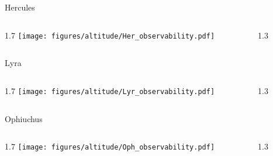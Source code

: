 \documentclass[final]{beamer}
\newlength{\colwidth}
\begin{document}
\begin{frame}[t]{}
  \Large{Hercules}
  \begin{columns}[T]
    \begin{column}{1.7\colwidth}
      \centering
      \texttt{[image: figures/altitude/Her\_observability.pdf]}
    \end{column}
    \begin{column}{1.3\colwidth}
      \Large
      
    \end{column}
  \end{columns}

  \Large{Lyra}
  \begin{columns}[T]
    \begin{column}{1.7\colwidth}
      \centering
      \texttt{[image: figures/altitude/Lyr\_observability.pdf]}
    \end{column}
    \begin{column}{1.3\colwidth}
      \Large
      
    \end{column}
  \end{columns}

  \Large{Ophiuchus}
  \begin{columns}[T]
    \begin{column}{1.7\colwidth}
      \centering
      \texttt{[image: figures/altitude/Oph\_observability.pdf]}
    \end{column}
    \begin{column}{1.3\colwidth}
      \Large
      
    \end{column}
  \end{columns}
\end{frame}

\end{document}
